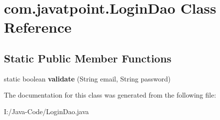 \hypertarget{classcom_1_1javatpoint_1_1_login_dao}{}\section{com.\+javatpoint.\+Login\+Dao Class Reference}
\label{classcom_1_1javatpoint_1_1_login_dao}
\subsection*{Static Public Member Functions}
\begin{DoxyCompactItemize}
\item 
\mbox{\label{classcom_1_1javatpoint_1_1_login_dao_abf3b8a09c712b7501559c059631a6f68}} 
static boolean {\bfseries validate} (String email, String password)
\end{DoxyCompactItemize}


The documentation for this class was generated from the following file\+:\begin{DoxyCompactItemize}
\item 
I\+:/\+Java-\/\+Code/Login\+Dao.\+java\end{DoxyCompactItemize}
